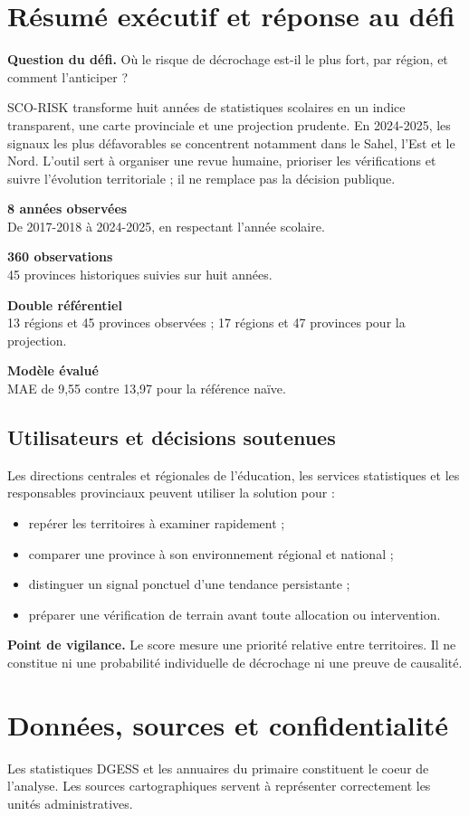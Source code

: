 \documentclass[12pt,a4paper]{article}
\newcommand{\keybox}[2]{%
  \begin{minipage}[t]{0.48\linewidth}
  \colorbox{Pale}{\parbox{0.92\linewidth}{\vspace{2mm}\textbf{\color{Blue}#1}\\[-1mm]{\small #2}\vspace{2mm}}}
  \end{minipage}}
\newcommand{\note}[1]{\colorbox{SoftOrange}{\parbox{0.96\linewidth}{\textbf{\color{Orange}Point de vigilance.} #1}}}
\begin{document}
\section{Résumé exécutif et réponse au défi}
\textbf{Question du défi.} Où le risque de décrochage est-il le plus fort, par région, et comment l'anticiper ?

SCO-RISK transforme huit années de statistiques scolaires en un indice transparent, une carte provinciale et une projection prudente. En 2024-2025, les signaux les plus défavorables se concentrent notamment dans le Sahel, l'Est et le Nord. L'outil sert à organiser une revue humaine, prioriser les vérifications et suivre l'évolution territoriale ; il ne remplace pas la décision publique.

\vspace{4mm}
\keybox{8 années observées}{De 2017-2018 à 2024-2025, en respectant l'année scolaire.}\hfill
\keybox{360 observations}{45 provinces historiques suivies sur huit années.}

\vspace{3mm}
\keybox{Double référentiel}{13 régions et 45 provinces observées ; 17 régions et 47 provinces pour la projection.}\hfill
\keybox{Modèle évalué}{MAE de 9,55 contre 13,97 pour la référence naïve.}

\subsection{Utilisateurs et décisions soutenues}
Les directions centrales et régionales de l'éducation, les services statistiques et les responsables provinciaux peuvent utiliser la solution pour :
\begin{itemize}
  \item repérer les territoires à examiner rapidement ;
  \item comparer une province à son environnement régional et national ;
  \item distinguer un signal ponctuel d'une tendance persistante ;
  \item préparer une vérification de terrain avant toute allocation ou intervention.
\end{itemize}

\note{Le score mesure une priorité relative entre territoires. Il ne constitue ni une probabilité individuelle de décrochage ni une preuve de causalité.}
\clearpage

\section{Données, sources et confidentialité}
Les statistiques DGESS et les annuaires du primaire constituent le coeur de l'analyse. Les sources cartographiques servent à représenter correctement les unités administratives.
\end{document}
